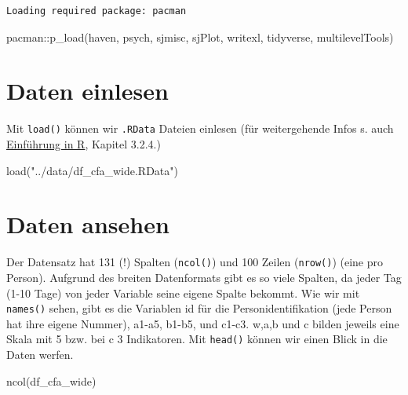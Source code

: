 \documentclass[
  letterpaper,
  DIV=11,
  numbers=noendperiod]{scrreprt}
\newenvironment{Shaded}{\begin{snugshade}}{\end{snugshade}}
\newcommand{\FunctionTok}[1]{\textcolor[rgb]{0.28,0.35,0.67}{#1}}
\newcommand{\NormalTok}[1]{\textcolor[rgb]{0.00,0.23,0.31}{#1}}
\newcommand{\SpecialCharTok}[1]{\textcolor[rgb]{0.37,0.37,0.37}{#1}}
\newcommand{\StringTok}[1]{\textcolor[rgb]{0.13,0.47,0.30}{#1}}
\begin{document}
\begin{verbatim}
Loading required package: pacman
\end{verbatim}

\begin{Shaded}
\begin{Highlighting}[]
\NormalTok{pacman}\SpecialCharTok{::}\FunctionTok{p\_load}\NormalTok{(haven, psych,}
\NormalTok{               sjmisc, sjPlot, writexl,}
\NormalTok{               tidyverse, multilevelTools)}
\end{Highlighting}
\end{Shaded}

\section{Daten einlesen}\label{daten-einlesen}

Mit \texttt{load()} können wir \texttt{.RData} Dateien einlesen (für
weitergehende Infos s. auch
\href{https://methodenlehre.github.io/einfuehrung-in-R/chapters/03-data_frames.html}{Einführung
in R}, Kapitel 3.2.4.)

\begin{Shaded}
\begin{Highlighting}[]
\FunctionTok{load}\NormalTok{(}\StringTok{"../data/df\_cfa\_wide.RData"}\NormalTok{)}
\end{Highlighting}
\end{Shaded}

\section{Daten ansehen}\label{daten-ansehen}

Der Datensatz hat 131 (!) Spalten (\texttt{ncol()}) und 100 Zeilen
(\texttt{nrow()}) (eine pro Person). Aufgrund des breiten Datenformats
gibt es so viele Spalten, da jeder Tag (1-10 Tage) von jeder Variable
seine eigene Spalte bekommt. Wie wir mit \texttt{names()} sehen, gibt es
die Variablen id für die Personidentifikation (jede Person hat ihre
eigene Nummer), a1-a5, b1-b5, und c1-c3. w,a,b und c bilden jeweils eine
Skala mit 5 bzw. bei c 3 Indikatoren. Mit \texttt{head()} können wir
einen Blick in die Daten werfen.

\begin{Shaded}
\begin{Highlighting}[]
\FunctionTok{ncol}\NormalTok{(df\_cfa\_wide)}
\end{Highlighting}
\end{Shaded}
\end{document}
